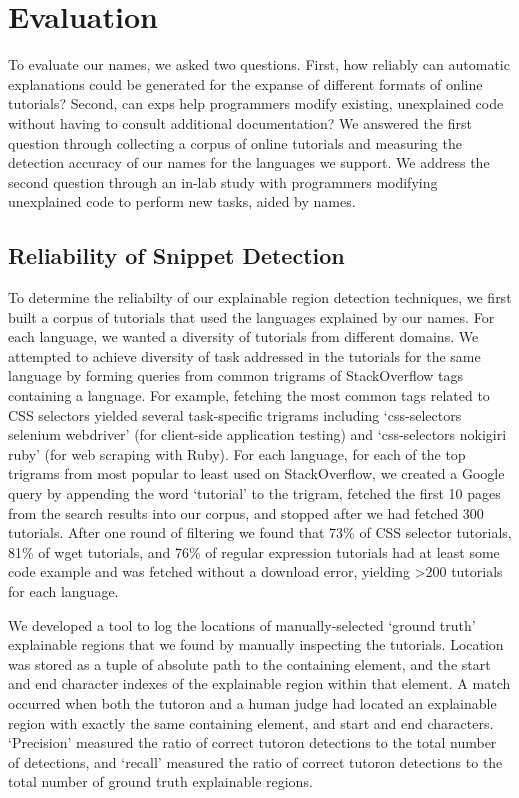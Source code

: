 \section{Evaluation}

\begin{changes}
To evaluate our \glspl{name}, we asked two questions.
First, how reliably can automatic explanations could be generated for the expanse of different formats of online tutorials?
Second, can \glspl{exp} help programmers modify existing, unexplained code without having to consult additional documentation?
We answered the first question through collecting a corpus of online tutorials and measuring the detection accuracy of our \glspl{name} for the languages we support.
We address the second question through an in-lab study with programmers modifying unexplained code to perform new tasks, aided by \glspl{name}.

\subsection{Reliability of Snippet Detection}

To determine the reliabilty of our explainable region detection techniques, we first built a corpus of tutorials that used the languages explained by our \glspl{name}.
For each language, we wanted a diversity of tutorials from different domains.
We attempted to achieve diversity of task addressed in the tutorials for the same language by forming queries from common trigrams of StackOverflow tags containing a language.
For example, fetching the most common tags related to CSS selectors yielded several task-specific trigrams including `css-selectors selenium webdriver' (for client-side application testing) and `css-selectors nokigiri ruby' (for web scraping with Ruby).
For each language, for each of the top trigrams from most popular to least used on StackOverflow, we created a Google query by appending the word `tutorial' to the trigram, fetched the first 10 pages from the search results into our corpus, and stopped after we had fetched 300 tutorials.
After one round of filtering we found that 73\% of CSS selector tutorials, 81\% of wget tutorials, and 76\% of regular expression tutorials had at least some code example and was fetched without a download error, yielding \textgreater 200 tutorials for each language.

We developed a tool to log the locations of manually-selected `ground truth' explainable regions that we found by manually inspecting the tutorials.
Location was stored as a tuple of absolute path to the containing element, and the start and end character indexes of the explainable region within that element.
A match occurred when both the tutoron and a human judge had located an explainable region with exactly the same containing element, and start and end characters.  
`Precision' measured the ratio of correct tutoron detections to the total number of detections, and `recall' measured the ratio of correct tutoron detections to the total number of ground truth explainable regions.


\end{changes}
